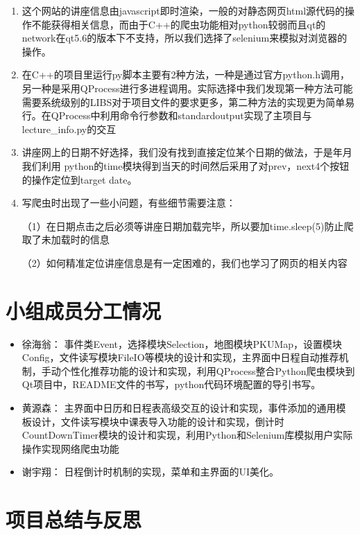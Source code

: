 \documentclass[11pt,hyperref,a4paper,UTF8]{ctexart}
\begin{document}
\begin{CJK}{UTF8}{gkai}
\begin{enumerate}
    \item 这个网站的讲座信息由javascript即时渲染，一般的对静态网页html源代码的操作不能获得相关信息，而由于C++的爬虫功能相对python较弱而且qt的network在qt5.6的版本下不支持，所以我们选择了selenium来模拟对浏览器的操作。
    \item 在C++的项目里运行py脚本主要有2种方法，一种是通过官方python.h调用，另一种是采用QProcess进行多进程调用。实际选择中我们发现第一种方法可能需要系统级别的LIBS对于项目文件的要求更多，第二种方法的实现更为简单易行。在QProcess中利用命令行参数和standardoutput实现了主项目与lecture\_info.py的交互
    \item 讲座网上的日期不好选择，我们没有找到直接定位某个日期的做法，于是年月我们利用 python的time模块得到当天的时间然后采用了对prev，next4个按钮的操作定位到target date。
    \item 写爬虫时出现了一些小问题，有些细节需要注意：

    （1）在日期点击之后必须等讲座日期加载完毕，所以要加time.sleep(5)防止爬取了未加载时的信息

    （2）如何精准定位讲座信息是有一定困难的，我们也学习了网页的相关内容
\end{enumerate}

\section{小组成员分工情况}
\begin{itemize}
    \item 徐海翁： 事件类Event，选择模块Selection，地图模块PKUMap，设置模块Config，文件读写模块FileIO等模块的设计和实现，主界面中日程自动推荐机制，手动个性化推荐功能的设计和实现，利用QProcess整合Python爬虫模块到Qt项目中，README文件的书写，python代码环境配置的导引书写。
    \item 黄源森： 主界面中日历和日程表高级交互的设计和实现，事件添加的通用模板设计，文件读写模块中课表导入功能的设计和实现，倒计时CountDownTimer模块的设计和实现，利用Python和Selenium库模拟用户实际操作实现网络爬虫功能
    \item 谢宇翔： 日程倒计时机制的实现，菜单和主界面的UI美化。
\end{itemize}

\section{项目总结与反思}


\end{CJK}
\end{document}
